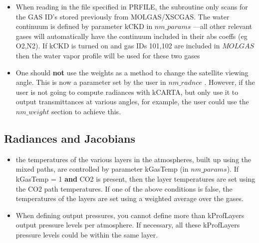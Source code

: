 \documentclass[12pt]{article}
\newcommand{\kc}{\textsf{kCARTA}\xspace}
\begin{document}
{{{\begin{itemize}
  So if 4 blocks are defined in WEIGHT, this means that after the
  program has read in the weights for all four blocks, a total of
  4*kProfLayer=400 mixed paths will have been defined by the program.
  
  Similarly, in RADFIL, the atmospheres are ordered sequentially,
  1-{\sf iNatm}, in the order they are read in.  However, the user
  can refer to any set of the declared mixed paths (from $nm\_weight$),
  when building up the atmosphere
  
\item When reading in the file specified in PRFILE, the subroutine
  only scans for the GAS ID's stored previously from MOLGAS/XSCGAS.
  The water continuum is defined by parameter {\sf kCKD} in
  $nm\_params$ ---all other relevant gases will automatically have the
  continuum included in their abs coeffs (eg O2,N2). If {\sf kCKD} is turned 
  on and gas IDs 101,102 are included in $MOLGAS$ then the water vapor profile
  will be used for these two gases
  
\item One should {\bf not} use the weights as a method to change the
  satellite viewing angle.  This is now a parameter set by the user in
  $nm\_radnce$ .  However, if the user is not going to compute radiances with
  \kc, but only use it to output transmittances at various angles, for
  example, the user could use the $nm\_weight$  section to achieve this.

\end{itemize}

\subsection{Radiances and Jacobians}

\begin{itemize}
\item the temperatures of the various layers in the atmospheres, built
  up using the mixed paths, are controlled by parameter {\sf kGasTemp}
  (in $nm\_params$).  If {\sf kGasTemp} = 1 {\bf and} CO2 is present, then
  the layer temperatures are set using the CO2 path temperatures.  If
  one of the above conditions is false, the temperatures of the layers
  are set using a weighted average over the gases.
  
\item When defining output pressures, you cannot define more than kProfLayers
  output pressure levels per atmosphere.  If necessary, all these kProfLayers
  pressure levels could be within the same layer.
  

\end{itemize}}}}
\end{document}
